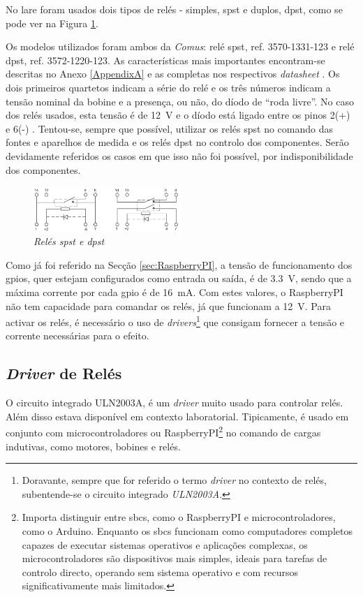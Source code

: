No \acrshort{lare} foram usados dois tipos de relés - simples, \acrfull{spst} e duplos, \acrfull{dpst}, como se pode ver na Figura \ref {fig:reles}.

Os modelos utilizados foram ambos da \textit{Comus}: relé \acrshort{spst}, ref. 3570-1331-123 e relé \acrshort{dpst}, ref. 3572-1220-123. As características mais importantes encontram-se descritas no Anexo \ref{AppendixA} e as completas nos respectivos \textit{datasheet} \cite{DryRelay}. Os dois primeiros quartetos indicam a série do relé e os três números indicam a tensão nominal da bobine e a presença, ou não, do díodo de ``roda livre''. No caso dos relés usados, esta tensão é de \SI{12}{\volt} e o díodo está ligado entre os pinos 2(+) e 6(-) \cite{DryRelay}. Tentou-se, sempre que possível, utilizar os relés \acrshort{spst} no comando das fontes e aparelhos de medida e os relés \acrshort{dpst} no controlo dos componentes. Serão devidamente referidos os casos em que isso não foi possível, por indisponibilidade dos componentes.

\begin{figure}[hbtp]
    \centering
    \includegraphics[width=0.5\textwidth]{figures/reles.png}
    \caption{\textit{Relés \acrshort{spst} e \acrshort{dpst}} \cite{DryRelay}}
    \label{fig:reles}
\end{figure}

Como já foi referido na Secção \ref{sec:RaspberryPI}, a tensão de funcionamento dos \acrshort{gpio}s, quer estejam configurados como entrada ou saída, é de \SI{3.3}{\volt}, sendo que a máxima corrente por cada \acrshort{gpio} é de \SI{16}{\mA}.
Com estes valores, o \gls{RaspberryPI} não tem capacidade para comandar os relés, já que funcionam a \SI{12}{\volt}. Para activar os relés, é necessário o uso de \textit{drivers}\footnote{Doravante, sempre que for referido o termo \textit{driver} no contexto de relés, subentende-se o circuito integrado \textit{ULN2003A}.} que consigam fornecer a tensão e corrente necessárias para o efeito.

\subsection{\textit{Driver} de Relés}
\label{sec:driver}
O circuito integrado ULN2003A, é um \textit{driver} muito usado para controlar relés. Além disso estava disponível em contexto laboratorial.
Tipicamente, é usado em conjunto com microcontroladores ou \gls{RaspberryPI}\footnote{Importa distinguir entre \gls{sbc}s, como o \gls{RaspberryPI} e microcontroladores, como o Arduino. Enquanto os \gls{sbc}s funcionam como computadores completos capazes de executar sistemas operativos e aplicações complexas, os microcontroladores são dispositivos mais simples, ideais para tarefas de controlo directo, operando sem sistema operativo e com recursos significativamente mais limitados.} no comando de cargas indutivas, como motores, bobines e relés.

